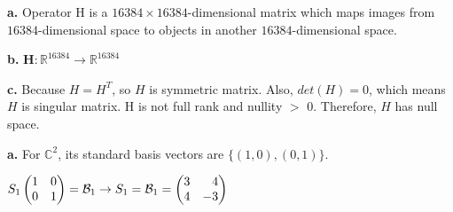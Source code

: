\documentclass[11pt,a4paper]{article}
\begin{document}
\noindent\begin{minipage}{0.49\linewidth}
\end{minipage}
\hspace{0.1cm}
\begin{minipage}{0.49\linewidth}
\end{minipage}
\newpage

\textbf{a.} Operator H is a $16384\times 16384$-dimensional matrix which maps images from $16384$-dimensional space to objects in another $16384$-dimensional space. 

\textbf{b.} $\mathbf{H}:\mathbb{R}^{16384}\rightarrow \mathbb{R}^{16384}$

\textbf{c.} Because $H=H^T$, so $H$ is symmetric matrix. Also, $det(H)=0$, which means $H$ is singular matrix. H is not full rank and nullity $>$ 0. Therefore, $H$ has null space. 

\newpage
{}
\textbf{a.} For $\mathbb{C}^2$, its standard basis vectors are $\{(1,0), (0,1)\}$.

$S_1\newvec{1&0\\0&1}=\mathcal{B}_1\rightarrow S_1=\mathcal{B}_1=\newvec{3&4\\4&-3}$
\end{document}
